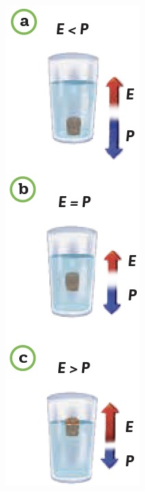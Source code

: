 \documentclass[11pt]{book}
\begin{document}
\begin{minipage}[t]{0.3\textwidth}
  \begin{figure}[H]
    \centering
    \includegraphics[width=0.6\linewidth]{vaso_arquimedes.jpg}
    \label{fig:vaso_arquimedes}
  \end{figure}
\end{minipage}\hfill
\end{document}
